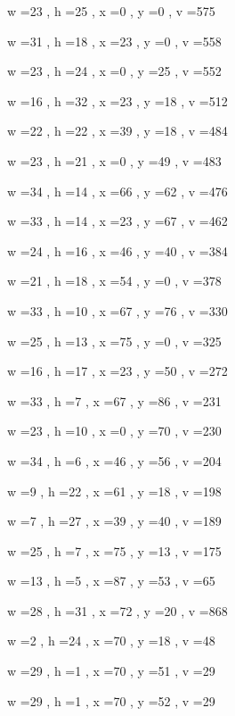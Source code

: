 \documentclass[11pt]{article}
\begin{document}
w =23 , h =25 , x =0 , y =0 , v =575
\par
w =31 , h =18 , x =23 , y =0 , v =558
\par
w =23 , h =24 , x =0 , y =25 , v =552
\par
w =16 , h =32 , x =23 , y =18 , v =512
\par
w =22 , h =22 , x =39 , y =18 , v =484
\par
w =23 , h =21 , x =0 , y =49 , v =483
\par
w =34 , h =14 , x =66 , y =62 , v =476
\par
w =33 , h =14 , x =23 , y =67 , v =462
\par
w =24 , h =16 , x =46 , y =40 , v =384
\par
w =21 , h =18 , x =54 , y =0 , v =378
\par
w =33 , h =10 , x =67 , y =76 , v =330
\par
w =25 , h =13 , x =75 , y =0 , v =325
\par
w =16 , h =17 , x =23 , y =50 , v =272
\par
w =33 , h =7 , x =67 , y =86 , v =231
\par
w =23 , h =10 , x =0 , y =70 , v =230
\par
w =34 , h =6 , x =46 , y =56 , v =204
\par
w =9 , h =22 , x =61 , y =18 , v =198
\par
w =7 , h =27 , x =39 , y =40 , v =189
\par
w =25 , h =7 , x =75 , y =13 , v =175
\par
w =13 , h =5 , x =87 , y =53 , v =65
\par
w =28 , h =31 , x =72 , y =20 , v =868
\par
w =2 , h =24 , x =70 , y =18 , v =48
\par
w =29 , h =1 , x =70 , y =51 , v =29
\par
w =29 , h =1 , x =70 , y =52 , v =29
\par
\newpage
\end{document}
